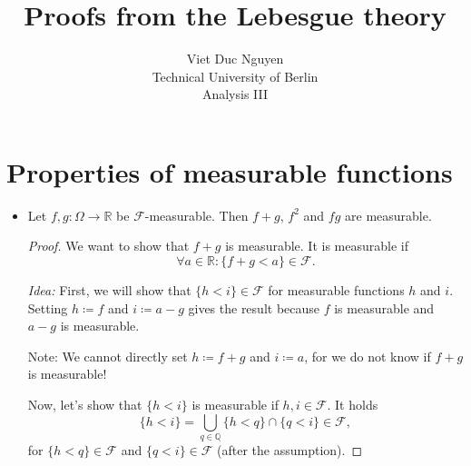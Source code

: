 \documentclass[a4paper, 11pt]{article}
\theoremstyle{plain}
\theoremstyle{definition}
\begin{document}
\title{Proofs from the Lebesgue theory}
\author{Viet Duc Nguyen\\ Technical University of Berlin\\ Analysis III}
\maketitle
\tableofcontents

\setcounter{section}{7}
\section{Properties of measurable functions}
\begin{itemize}
	\item Let $f,g: \Omega \to \mathbb R$ be $\mathcal F$-measurable. Then $f+g$, $f^2$ and $fg$ are measurable.
	\begin{proof}[Proof]
		We want to show that $f+g$ is measurable. It is measurable if 
		$$\forall a \in \mathbb R: \{ f+g < a \} \in \mathcal F.$$ 
		
		\textit{Idea:} First, we will show that $\{ h < i \} \in \mathcal F$ for measurable functions $h$ and $i$. Setting $h \coloneqq f$ and $i \coloneqq a-g$ gives the result because $f$ is measurable and $a-g$ is measurable.
		
		Note: We cannot directly set $h \coloneqq f+g$ and $i \coloneqq a$, for we do not know if $f+g$ is measurable!
		
		Now, let's show that $\{ h < i \}$ is measurable if $h,i \in \mathcal F$. It holds
		\[
			\{ h < i \} = \bigcup_{q \in \mathbb Q} \{ h < q \} \cap \{ q < i \} \in \mathcal F,
		\]
		for $\{ h < q \} \in \mathcal F$ and $\{ q < i \} \in \mathcal F$ (after the assumption).
		

\end{proof}
\end{itemize}
\end{document}
